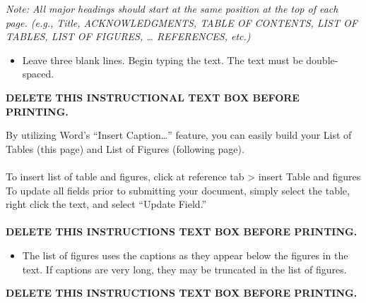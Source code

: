 \documentclass[a4paper,12pt,one side]{report}
\theoremstyle{definition}
\begin{document}
\begin{tcolorbox}[enhanced jigsaw,
    sharp corners,
    boxrule=0.5pt, 
    colback=blue!30!white,   
    borderline={0.5pt}{-2pt}{black,solid} %
 ]
 \begin{justify}
\emph{Note: All major headings should start at the same position at the top of each page. (e.g., Title, ACKNOWLEDGMENTS, TABLE OF CONTENTS, LIST OF TABLES, LIST OF FIGURES, … REFERENCES, etc.)}
\begin{itemize}
    \item Leave three blank lines. Begin typing the text. The text must be double-spaced.
\end{itemize}
{\bf DELETE THIS INSTRUCTIONAL TEXT BOX BEFORE PRINTING.}
 \end{justify}
\end{tcolorbox}


\newpage
\tableofcontents
\listoftables
{}
\begin{tcolorbox}[enhanced jigsaw,
    sharp corners,
    boxrule=0.5pt, 
    colback=blue!30!white,   
    borderline={0.5pt}{-2pt}{black,solid} %
 ]
 \begin{justify}
By utilizing Word’s “Insert Caption…” feature, you can easily build your List of Tables (this page) and List of Figures (following page). \\~\\ 
To insert list of table and figures, click at reference tab > insert Table and figures
To update all fields prior to submitting your document, simply select the table, right click the text, and select “Update Field.”\\~\\
{\bf DELETE THIS INSTRUCTIONS TEXT BOX BEFORE PRINTING.}
\end{justify}
\end{tcolorbox}
\newpage
\listoffigures
{}
\begin{tcolorbox}[enhanced jigsaw,
    sharp corners,
    boxrule=0.5pt, 
    colback=blue!30!white,   
    borderline={0.5pt}{-2pt}{black,solid} %
 ]
 \begin{justify}
\begin{itemize}
    \item The list of figures uses the captions as they appear below the figures in the text. If captions are very long, they may be truncated in the list of figures.\end{itemize} \vspace{1cm}
{\bf DELETE THIS INSTRUCTIONS TEXT BOX BEFORE PRINTING.}
 \end{justify}
\end{tcolorbox}
\newpage
{}
\end{document}
